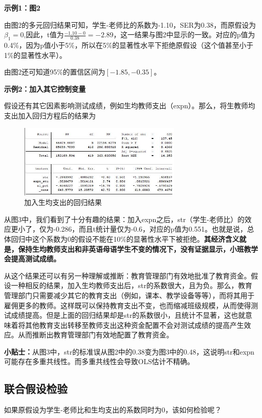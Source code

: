 \documentclass[cn,10pt,math=newtx,citestyle=gb7714-2015,bibstyle=gb7714-2015]{elegantbook}
\begin{document}
	\textbf{示例1：图2}
	
	由图2的多元回归结果可知，学生-老师比的系数为-1.10，SER为0.38，而原假设为$\beta_1=0$,因此，t值为$\frac{-1.10-0}{0.38}=-2.89$，这一结果与图2中显示的一致。对应的p值为0.4\%，因为p值小于5\%，所以在5\%的显著性水平下拒绝原假设（这个值甚至小于1\%的显著性水平）。
	
	由图2还可知道95\%的置信区间为$[-1.85,-0.35]$。
	
	\textbf{示例2：加入其它控制变量}
	
	假设还有其它因素影响测试成绩，例如生均教师支出（expn）。那么，将生教师均支出加入回归方程后的结果为
	\begin{figure}[htbp]
		\centering
		\includegraphics[width=0.7\textwidth]{expn.jpg}
		\caption{加入生均支出的回归结果}\label{fig:digit}
	\end{figure}
	
	从图3中，我们看到了十分有趣的结果：加入expn之后，str（学生-老师比）的效应更小了，仅为-0.286，而且t统计量仅为-0.6，对应的p值为0.551。也就是说，总体回归中这个系数为0的假设不能在10\%的显著性水平下被拒绝。\textbf{其经济含义就是，保持生均教师支出和非英语母语学生不变的情况下，没有证据显示，小班教学会提高测试成绩。}
	
	从这个结果还可以有另一种理解或推断：教育管理部门有效地批准了教育资金。假设一种相反的结果，加入生均教师支出后，str的系数很大，且为负。那么，教育管理部门只需要减少其它的教育支出（例如，课本、教学设备等等），而将其用于雇佣更多的教师。这样既可以保持教育支出不变，也而缩减班级规模，从而使得测试成绩提高。但是上面的回归结果却是str的系数很小，且统计不显著，这也就意味着将其他教育支出转移至教师支出这种资金配置不会对测试成绩的提高产生效应。从而推断出教育管理部门有效地配置了教育资金。
	
	\textbf{小贴士：}从图3中，str的标准误从图2中的0.38变为图3中的0.48，这说明str和expn可能存在多重共线性。而多重共线性会导致OLS估计不精确。
	
	\subsection{联合假设检验}
	如果原假设为学生-老师比和生均支出的系数同时为0，该如何检验呢？
	
\end{document}
